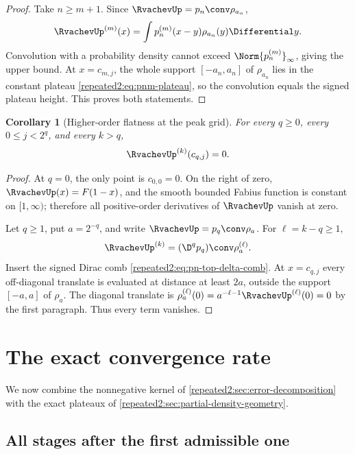 \documentclass[11pt,oneside]{article}
\newtheorem{corollary}[corollary]{Corollary}
\theoremstyle{definition}
\theoremstyle{remark}
\begin{document}
\begin{proof}
Take $n\ge m+1$.  Since $\RvachevUp=p_n\conv\rho_{a_n}$,
\[
 \RvachevUp^{(m)}(x)=\int p_n^{(m)}(x-y)\rho_{a_n}(y)\Differential y.
\]
Convolution with a probability density cannot exceed
$\Norm{p_n^{(m)}}_\infty$, giving the upper bound.  At $x=c_{m,j}$, the whole support
$[-a_n,a_n]$ of $\rho_{a_n}$ lies in the constant plateau
\eqref{repeated2:eq:pnm-plateau}, so the convolution equals the signed plateau height.  This proves
both statements.
\end{proof}

\begin{corollary}[Higher-order flatness at the peak grid]
\label{repeated2:cor:higher-flatness-grid}
For every $q\ge0$, every $0\le j<2^q$, and every $k>q$,
\begin{equation}
 \RvachevUp^{(k)}(c_{q,j})=0.
 \label{repeated2:eq:higher-flatness-grid}
\end{equation}
\end{corollary}

\begin{proof}
At $q=0$, the only point is $c_{0,0}=0$.  On the right of zero,
$\RvachevUp(x)=F(1-x)$, and the smooth bounded Fabius function is constant on $[1,\infty)$;
therefore all positive-order derivatives of $\RvachevUp$ vanish at zero.

Let $q\ge1$, put $a=2^{-q}$, and write $\RvachevUp=p_q\conv\rho_a$.  For
$\ell=k-q\ge1$,
\[
 \RvachevUp^{(k)}=(\D^q p_q)\conv\rho_a^{(\ell)}.
\]
Insert the signed Dirac comb \eqref{repeated2:eq:pn-top-delta-comb}.  At $x=c_{q,j}$ every
off-diagonal translate is evaluated at distance at least $2a$, outside the support
$[-a,a]$ of $\rho_a$.  The diagonal translate is
$\rho_a^{(\ell)}(0)=a^{-\ell-1}\RvachevUp^{(\ell)}(0)=0$ by the first paragraph.
Thus every term vanishes.
\end{proof}

\section{The exact convergence rate}
\label{repeated2:sec:exact-rate}

We now combine the nonnegative kernel of \cref{repeated2:sec:error-decomposition} with the exact
plateaux of \cref{repeated2:sec:partial-density-geometry}.

\subsection{All stages after the first admissible one}
\end{document}

